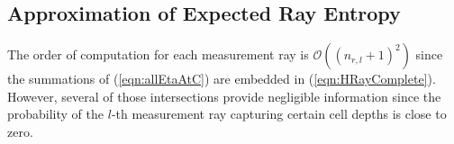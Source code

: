 \documentclass[letterpaper, 10pt, conference]{ieeeconf}
\newcommand{\refeqn}[1]{(\ref{eqn:#1})}
\begin{document}
%


\subsection{Approximation of Expected Ray Entropy}

The order of computation for each measurement ray is $\mathcal O((n_{r,l}+1)^2)$ since the summations of \refeqn{allEtaAtC} are embedded in \refeqn{HRayComplete}. However, several of those intersections provide negligible information since the probability of the $l$-th measurement ray capturing certain cell depths is close to zero.
\end{document}
